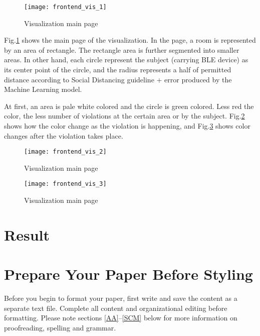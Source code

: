 \documentclass[conference]{IEEEtran}
\begin{document}
\begin{figure}[htbp]
    \centerline{\texttt{[image: frontend\_vis\_1]}}
    \caption{Visualization main page}
    \label{fig:frontend_vis_1}
\end{figure}

Fig.\ref{fig:frontend_vis_1} shows the main page of the visualization.
In the page, a room is represented by an area of rectangle. The rectangle
area is further segmented into smaller areas. In other hand, each circle
represent the subject (carrying BLE device) as its center point of the circle,
and the radius represents a half of permitted distance according to 
Social Distancing guideline + error produced by the Machine Learning model.


At first, an area is pale white colored and the circle is green colored.
Less red the color, the less number of violations at the certain area
or by the subject. Fig.\ref{fig:frontend_vis_2} shows how the color change
as the violation is happening, and Fig.\ref{fig:frontend_vis_3} shows
color changes after the violation takes place. 

\begin{figure}[htbp]
    \centerline{\texttt{[image: frontend\_vis\_2]}}
    \caption{Visualization main page}
    \label{fig:frontend_vis_2}
\end{figure}

\begin{figure}[htbp]
    \centerline{\texttt{[image: frontend\_vis\_3]}}
    \caption{Visualization main page}
    \label{fig:frontend_vis_3}
\end{figure}


\section{Result}



\section{Prepare Your Paper Before Styling}
Before you begin to format your paper, first write and save the content as a 
separate text file. Complete all content and organizational editing before 
formatting. Please note sections \ref{AA}--\ref{SCM} below for more information on 
proofreading, spelling and grammar.
\end{document}
